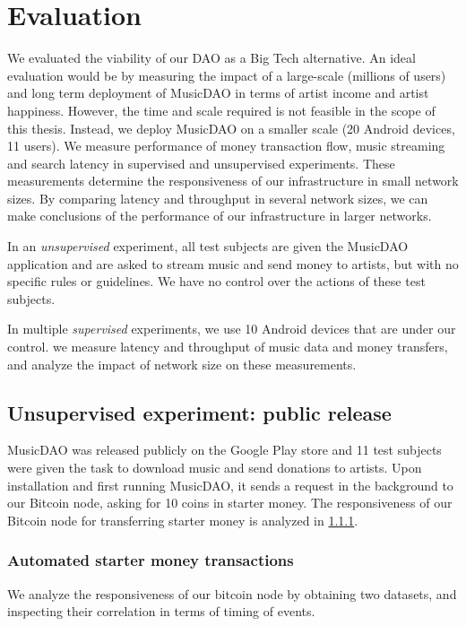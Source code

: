 \chapter{\label{chap:evaluation}Evaluation}
We evaluated the viability of our DAO as a Big Tech alternative. An ideal evaluation would be by measuring the impact of a large-scale (millions of users) and long term deployment of MusicDAO in terms of artist income and artist happiness. However, the time and scale required is not feasible in the scope of this thesis. Instead, we deploy MusicDAO on a smaller scale (20 Android devices, 11 users). We measure performance of money transaction flow, music streaming and search latency in supervised and unsupervised experiments. These measurements determine the responsiveness of our infrastructure in small network sizes. By comparing latency and throughput in several network sizes, we can make conclusions of the performance of our infrastructure in larger networks.

In an \textit{unsupervised} experiment, all test subjects are given the MusicDAO application and are asked to stream music and send money to artists, but with no specific rules or guidelines. We have no control over the actions of these test subjects.

In multiple \textit{supervised} experiments, we use 10 Android devices that are under our control. we measure latency and throughput of music data and money transfers, and analyze the impact of network size on these measurements.


\section{Unsupervised experiment: public release}
MusicDAO was released publicly on the Google Play store and 11 test subjects were given the task to download music and send donations to artists. Upon installation and first running MusicDAO, it sends a request in the background to our Bitcoin node, asking for 10 coins in starter money. The responsiveness of our Bitcoin node for transferring starter money is analyzed in \ref{starter-money-flow}.

\subsection{Automated starter money transactions}
\label{starter-money-flow}
We analyze the responsiveness of our bitcoin node by obtaining two datasets, and inspecting their correlation in terms of timing of events.

